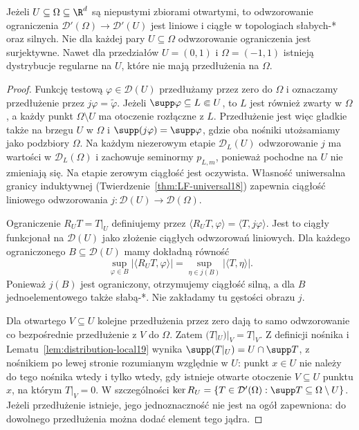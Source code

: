 \begin{twierdzenie}
\label{thm:restriction25}
Jeżeli $U\subseteq\Omega\subseteq\R^d$ są niepustymi
zbiorami otwartymi, to odwzorowanie ograniczenia
$\mathcal D'(\Omega)\to\mathcal D'(U)$ jest liniowe
i ciągłe w topologiach słabych-* oraz silnych.
Nie dla każdej pary $U\subseteq\Omega$ odwzorowanie
ograniczenia jest surjektywne. Nawet dla przedziałów
$U=(0,1)$ i $\Omega=(-1,1)$ istnieją dystrybucje
regularne na $U$, które nie mają przedłużenia na $\Omega$.
\end{twierdzenie}
\begin{proof}
Funkcję testową $\varphi\in\mathcal D(U)$ przedłużamy
przez zero do $\Omega$ i oznaczamy przedłużenie przez
$j\varphi=\widetilde\varphi$. Jeżeli
$\supp\varphi\subseteq L\Subset U$, to $L$ jest również
zwarty w $\Omega$, a każdy punkt $\Omega\setminus U$
ma otoczenie rozłączne z $L$. Przedłużenie jest więc
gładkie także na brzegu $U$ w $\Omega$ i
$\supp(j\varphi)=\supp\varphi$, gdzie oba nośniki
utożsamiamy jako podzbiory $\Omega$.
Na każdym niezerowym etapie $\mathcal D_L(U)$
odwzorowanie $j$ ma wartości w $\mathcal D_L(\Omega)$
i zachowuje seminormy $p_{L,m}$, ponieważ pochodne
na $U$ nie zmieniają się. Na etapie zerowym ciągłość
jest oczywista. Własność uniwersalna granicy induktywnej
(Twierdzenie~\ref{thm:LF-universal18}) zapewnia ciągłość
liniowego odwzorowania $j:\mathcal D(U)\to\mathcal D(\Omega)$.

Ograniczenie $R_U T=T|_U$ definiujemy przez
$\langle R_U T,\varphi\rangle=\langle T,j\varphi\rangle$.
Jest to ciągły funkcjonał na $\mathcal D(U)$ jako
złożenie ciągłych odwzorowań liniowych.
Dla każdego ograniczonego $B\subseteq\mathcal D(U)$
mamy dokładną równość
\[
 \sup_{\varphi\in B}|\langle R_U T,\varphi\rangle|
 =\sup_{\eta\in j(B)}|\langle T,\eta\rangle|.
\]
Ponieważ $j(B)$ jest ograniczony, otrzymujemy ciągłość
silną, a dla $B$ jednoelementowego także słabą-*.
Nie zakładamy tu gęstości obrazu $j$.

Dla otwartego $V\subseteq U$ kolejne przedłużenia przez
zero dają to samo odwzorowanie co bezpośrednie
przedłużenie z $V$ do $\Omega$. Zatem
$(T|_U)|_V=T|_V$. Z definicji nośnika i
Lematu~\ref{lem:distribution-local19} wynika
$\supp(T|_U)=U\cap\supp T$, z nośnikiem po lewej
stronie rozumianym względnie w $U$: punkt $x\in U$
nie należy do tego nośnika wtedy i tylko wtedy,
gdy istnieje otwarte otoczenie $V\subseteq U$ punktu
$x$, na którym $T|_V=0$. W szczególności
$\ker R_U=\{T\in\mathcal D'(\Omega):
\supp T\subseteq\Omega\setminus U\}$.
Jeżeli przedłużenie istnieje, jego jednoznaczność
nie jest na ogół zapewniona: do dowolnego przedłużenia
można dodać element tego jądra.


\end{proof}
